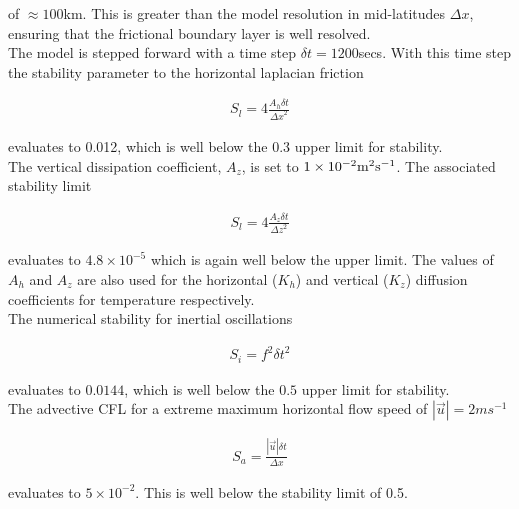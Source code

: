 \noindent  of $\approx 100$km. This is greater than the model
resolution in mid-latitudes $\Delta x$, ensuring that the frictional 
boundary layer is well resolved.
\\

\noindent The model is stepped forward with a 
time step $\delta t=1200$secs. With this time step the stability 
parameter to the horizontal laplacian friction \cite{Adcroft_thesis}

\begin{eqnarray}
\label{EQ:laplacian_stability}
S_{l} = 4 \frac{A_{h} \delta t}{{\Delta x}^2}
\end{eqnarray}

\noindent evaluates to 0.012, which is well below the 0.3 upper limit
for stability. 
\\

\noindent The vertical dissipation coefficient, $A_{z}$, is set to 
$1\times10^{-2} {\rm m}^2{\rm s}^{-1}$. The associated stability limit

\begin{eqnarray}
\label{EQ:laplacian_stability_z}
S_{l} = 4 \frac{A_{z} \delta t}{{\Delta z}^2}
\end{eqnarray}

\noindent evaluates to $4.8 \times 10^{-5}$ which is again well below
the upper limit.
The values of $A_{h}$ and $A_{z}$ are also used for the horizontal ($K_{h}$) 
and vertical ($K_{z}$) diffusion coefficients for temperature respectively.
\\

\noindent The numerical stability for inertial oscillations
\cite{Adcroft_thesis} 

\begin{eqnarray}
\label{EQ:inertial_stability}
S_{i} = f^{2} {\delta t}^2
\end{eqnarray}

\noindent evaluates to $0.0144$, which is well below the $0.5$ upper 
limit for stability.
\\

\noindent The advective CFL \cite{Adcroft_thesis} for a extreme maximum 
horizontal flow
speed of $ | \vec{u} | = 2 ms^{-1}$

\begin{eqnarray}
\label{EQ:cfl_stability}
S_{a} = \frac{| \vec{u} | \delta t}{ \Delta x}
\end{eqnarray}

\noindent evaluates to $5 \times 10^{-2}$. This is well below the stability 
limit of 0.5.
\\

